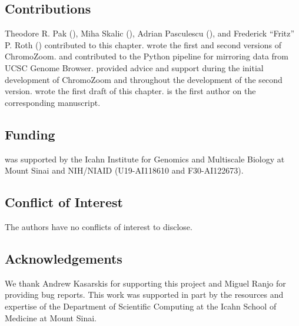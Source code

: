 \subsection*{Contributions}

Theodore R. Pak (), Miha Skalic (), Adrian Pasculescu (), and Frederick ``Fritz'' P. Roth () contributed to this chapter.  wrote the first and second versions of ChromoZoom.  and  contributed to the Python pipeline for mirroring data from UCSC Genome Browser.  provided advice and support during the initial development of ChromoZoom and throughout the development of the second version.  wrote the first draft of this chapter.  is the first author on the corresponding manuscript.

\subsection*{Funding}

 was supported by the Icahn Institute for Genomics and Multiscale Biology at Mount Sinai and NIH/NIAID (U19-AI118610 and F30-AI122673).

\subsection*{Conflict of Interest}

The authors have no conflicts of interest to disclose.

\subsection*{Acknowledgements}

We thank Andrew Kasarskis for supporting this project and Miguel Ranjo for providing bug reports. This work was supported in part by the resources and expertise of the Department of Scientific Computing at the Icahn School of Medicine at Mount Sinai.
